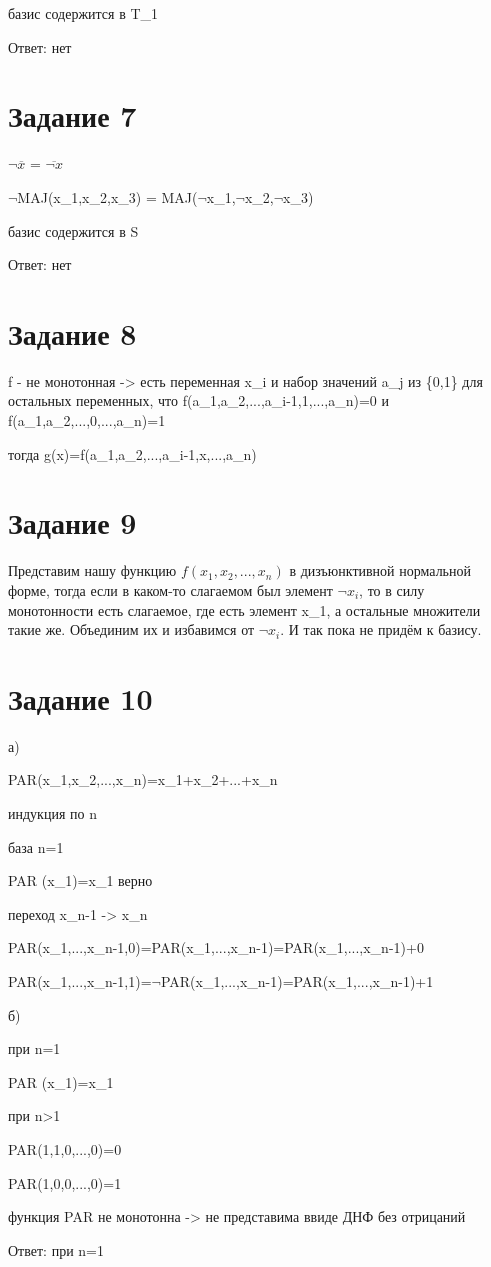 \documentclass[a4paper, 12pt]{article}
\newcommand{\dnot}{$\neg$}
\begin{document}
		базис содержится в T_1

		Ответ: нет
	\section*{Задание 7}
		$\lnot \overline{x}$ = $\overline{\lnot x}$
		
		\dnot MAJ(x_1,x_2,x_3) = MAJ(\dnot x_1,\dnot x_2,\dnot x_3)

		базис содержится в S

		Ответ: нет
	\section*{Задание 8}
		f - не монотонная -> есть переменная x_i и набор значений a_j из \{0,1\} для остальных переменных, что f(a_1,a_2,...,a_{i-1},1,...,a_n)=0 и f(a_1,a_2,...,0,...,a_n)=1

		тогда g(x)=f(a_1,a_2,...,a_{i-1},x,...,a_n)
	\section*{Задание 9}
		Представим нашу функцию $f(x_1, x_2, ..., x_n)$ в дизъюнктивной нормальной форме, тогда если в каком-то слагаемом был элемент $\neg x_i$, то в силу монотонности есть слагаемое, где есть элемент x_1, а остальные множители такие же. Объединим их и избавимся от $\neg x_i$. И так пока не придём к базису.
	\section*{Задание 10}
		а)

		PAR(x_1,x_2,...,x_n)=x_1+x_2+...+x_n

		индукция по n

		база n=1

		PAR (x_1)=x_1 верно

		переход x_{n-1} -> x_n

		PAR(x_1,...,x_{n-1},0)=PAR(x_1,...,x_{n-1})=PAR(x_1,...,x_{n-1})+0

		PAR(x_1,...,x_{n-1},1)=\dnot PAR(x_1,...,x_{n-1})=PAR(x_1,...,x_{n-1})+1

		б)

		при  n=1

		PAR (x_1)=x_1

		при n>1

		PAR(1,1,0,...,0)=0

		PAR(1,0,0,...,0)=1

		функция PAR не монотонна -> не представима ввиде ДНФ без отрицаний

		Ответ: при n=1
\end{document}
